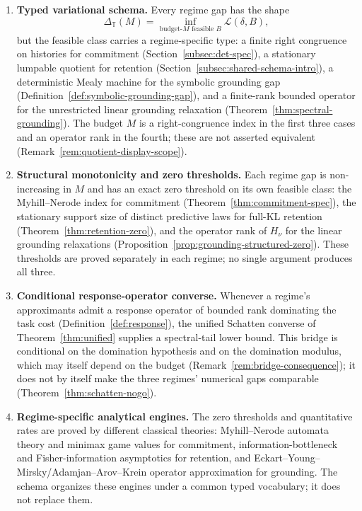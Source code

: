 \documentclass[12pt]{article}
\theoremstyle{definition}
\begin{document}
\begin{enumerate}[label=(\Roman*),leftmargin=2.2em]
\item \textbf{Typed variational schema.}
Every regime gap has the shape
\[
\Delta_{\mathbb T}(M)=\inf_{\text{budget-}M\text{ feasible }B}
\mathcal L(\delta,B),
\]
but the feasible class carries a regime-specific type: a finite right
congruence on histories for commitment (Section~\ref{subsec:det-spec}), a
stationary lumpable quotient for retention
(Section~\ref{subsec:shared-schema-intro}), a deterministic Mealy machine for
the symbolic grounding gap (Definition~\ref{def:symbolic-grounding-gap}), and
a finite-rank bounded operator for the unrestricted linear grounding
relaxation (Theorem~\ref{thm:spectral-grounding}).  The budget $M$ is a
right-congruence index in the first three cases and an operator rank in the
fourth; these are not asserted equivalent
(Remark~\ref{rem:quotient-display-scope}).

\item \textbf{Structural monotonicity and zero thresholds.}
Each regime gap is non-increasing in $M$ and has an exact zero threshold on
its own feasible class: the Myhill--Nerode index for commitment
(Theorem~\ref{thm:commitment-spec}), the stationary support size of distinct
predictive laws for full-KL retention (Theorem~\ref{thm:retention-zero}), and
the operator rank of $H_\nu$ for the linear grounding relaxations
(Proposition~\ref{prop:grounding-structured-zero}).  These thresholds are
proved separately in each regime; no single argument produces all three.

\item \textbf{Conditional response-operator converse.}
Whenever a regime's approximants admit a response operator of bounded rank
dominating the task cost (Definition~\ref{def:response}), the unified
Schatten converse of Theorem~\ref{thm:unified} supplies a spectral-tail lower
bound.  This bridge is conditional on the domination hypothesis and on the
domination modulus, which may itself depend on the budget
(Remark~\ref{rem:bridge-consequence}); it does not by itself make the three
regimes' numerical gaps comparable (Theorem~\ref{thm:schatten-nogo}).

\item \textbf{Regime-specific analytical engines.}
The zero thresholds and quantitative rates are proved by different classical
theories: Myhill--Nerode automata theory and minimax game values for
commitment, information-bottleneck and Fisher-information asymptotics for
retention, and Eckart--Young--Mirsky/Adamjan--Arov--Krein operator
approximation for grounding.  The schema organizes these engines under a
common typed vocabulary; it does not replace them.
\end{enumerate}
\end{document}
